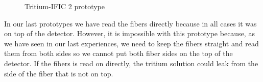 \begin{figure}[htbp]
\centering
{}
\caption{Tritium-IFIC 2 prototype} \label{fig:Tritium_IFIC_2}
\end{figure}

In our last prototypes we have read the fibers directly because in all cases it was on top of the detector. However, it is impossible with this prototype because, as we have seen in our last experiences, we need to keep the fibers straight and read them from both sides so we cannot put both fiber sides on the top of the detector. If the fibers is read on directly, the tritium solution could leak from the side of the fiber that is not on top. 


